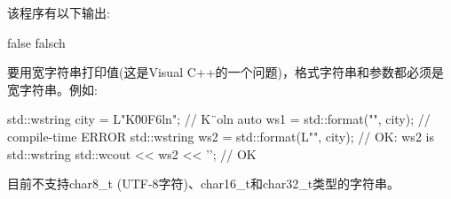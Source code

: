 该程序有以下输出:

\begin{shell}
false falsch
\end{shell}

要用宽字符串打印值(这是Visual C++的一个问题)，格式字符串和参数都必须是宽字符串。例如:

\begin{cpp}
std::wstring city = L"K\u00F6ln"; // K¨oln
auto ws1 = std::format("{}", city); // compile-time ERROR
std::wstring ws2 = std::format(L"{}", city); // OK: ws2 is std::wstring
std::wcout << ws2 << '\n'; // OK
\end{cpp}

目前不支持char8\_t (UTF-8字符)、char16\_t和char32\_t类型的字符串。






